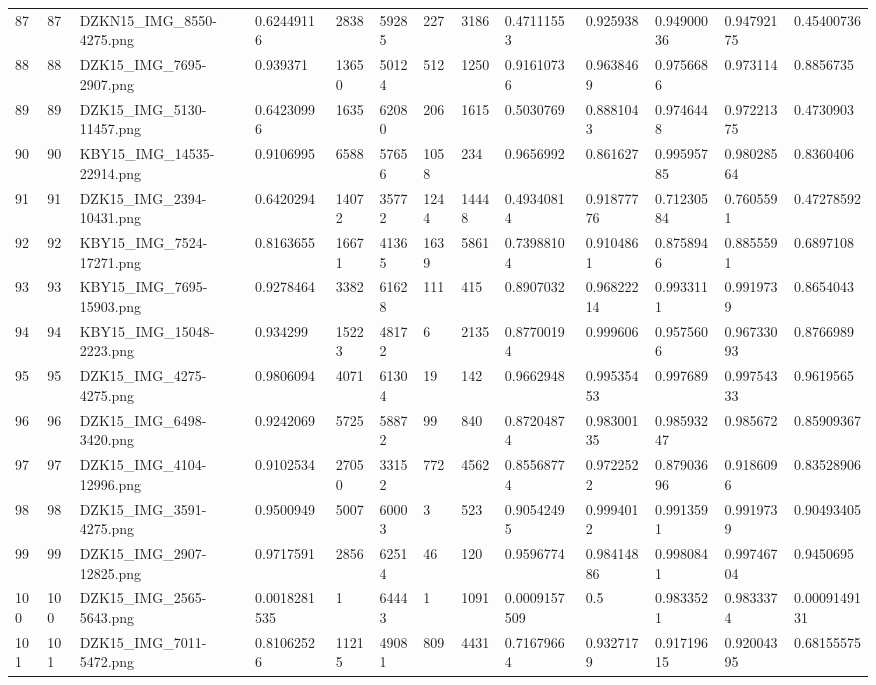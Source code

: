 \documentclass[11pt, a4paper, twoside]{report}
\begin{document}
\begin{longtable}[c]{@{}lllllllllllll@{}}
87 & 87 & DZKN15\_IMG\_8550-4275.png & 0.62449116 & 2838 & 59285 & 227 & 3186 & 0.47111553 & 0.925938 & 0.94900036 & 0.94792175 & 0.45400736 \\
88 & 88 & DZK15\_IMG\_7695-2907.png & 0.939371 & 13650 & 50124 & 512 & 1250 & 0.91610736 & 0.9638469 & 0.9756686 & 0.973114 & 0.8856735 \\
89 & 89 & DZK15\_IMG\_5130-11457.png & 0.64230996 & 1635 & 62080 & 206 & 1615 & 0.5030769 & 0.8881043 & 0.9746448 & 0.97221375 & 0.4730903 \\
90 & 90 & KBY15\_IMG\_14535-22914.png & 0.9106995 & 6588 & 57656 & 1058 & 234 & 0.9656992 & 0.861627 & 0.99595785 & 0.98028564 & 0.8360406 \\
91 & 91 & DZK15\_IMG\_2394-10431.png & 0.6420294 & 14072 & 35772 & 1244 & 14448 & 0.49340814 & 0.91877776 & 0.71230584 & 0.7605591 & 0.47278592 \\
92 & 92 & KBY15\_IMG\_7524-17271.png & 0.8163655 & 16671 & 41365 & 1639 & 5861 & 0.73988104 & 0.9104861 & 0.8758946 & 0.8855591 & 0.6897108 \\
93 & 93 & KBY15\_IMG\_7695-15903.png & 0.9278464 & 3382 & 61628 & 111 & 415 & 0.8907032 & 0.96822214 & 0.9933111 & 0.9919739 & 0.8654043 \\
94 & 94 & KBY15\_IMG\_15048-2223.png & 0.934299 & 15223 & 48172 & 6 & 2135 & 0.87700194 & 0.999606 & 0.9575606 & 0.96733093 & 0.8766989 \\
95 & 95 & DZK15\_IMG\_4275-4275.png & 0.9806094 & 4071 & 61304 & 19 & 142 & 0.9662948 & 0.99535453 & 0.997689 & 0.99754333 & 0.9619565 \\
96 & 96 & DZK15\_IMG\_6498-3420.png & 0.9242069 & 5725 & 58872 & 99 & 840 & 0.87204874 & 0.98300135 & 0.98593247 & 0.985672 & 0.85909367 \\
97 & 97 & DZK15\_IMG\_4104-12996.png & 0.9102534 & 27050 & 33152 & 772 & 4562 & 0.85568774 & 0.9722522 & 0.87903696 & 0.9186096 & 0.83528906 \\
98 & 98 & DZK15\_IMG\_3591-4275.png & 0.9500949 & 5007 & 60003 & 3 & 523 & 0.90542495 & 0.9994012 & 0.9913591 & 0.9919739 & 0.90493405 \\
99 & 99 & DZK15\_IMG\_2907-12825.png & 0.9717591 & 2856 & 62514 & 46 & 120 & 0.9596774 & 0.98414886 & 0.9980841 & 0.99746704 & 0.9450695 \\
100 & 100 & DZK15\_IMG\_2565-5643.png & 0.0018281535 & 1 & 64443 & 1 & 1091 & 0.0009157509 & 0.5 & 0.9833521 & 0.9833374 & 0.0009149131 \\
101 & 101 & DZK15\_IMG\_7011-5472.png & 0.81062526 & 11215 & 49081 & 809 & 4431 & 0.71679664 & 0.9327179 & 0.91719615 & 0.92004395 & 0.68155575 \\

\end{longtable}
\end{document}
